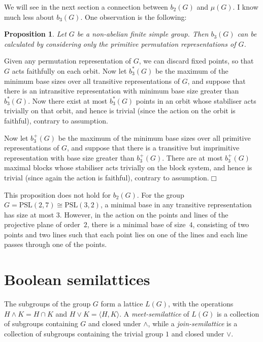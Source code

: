 \documentclass[12pt]{article}
\newtheorem{prop}{Proposition}[section]
\newenvironment{pf}{\prepf\rm}{\endprepf}
\newcommand{\qed}{\hfill$\Box$}
\begin{document}
We will see in the next section a connection between $b_2(G)$ and $\mu(G)$.
I know much less about $b_3(G)$. One observation is the following:

\begin{prop}
Let $G$ be a non-abelian finite simple group. Then $b_3(G)$ can be calculated
by considering only the primitive permutation representations of $G$.
\end{prop}

\begin{pf}
Given any permutation representation of $G$, we can discard fixed points, so
that $G$ acts faithfully on each orbit. Now let $b_3^*(G)$ be the maximum
of the minimum base sizes over all transitive representations of $G$, and
suppose that there is an intransitive representation with minimum base size
greater than $b_3^*(G)$. Now there exist at most $b_3^*(G)$ points in an orbit
whose stabiliser acts trivially on that orbit, and hence is trivial (since
the action on the orbit is faithful), contrary to assumption.

Now let $b_3^+(G)$ be the maximum of the minimum base sizes over all primitive
representations of $G$, and suppose that there is a transitive but
imprimitive representation with base size greater than $b_3^+(G)$. There are
at most $b_3^+(G)$ maximal blocks whose stabiliser acts trivially on the
block system, and hence is trivial (since again the action is faithful),
contrary to assumption.\qed
\end{pf}

This proposition does not hold for $b_2(G)$. For the group
$G=\mathrm{PSL}(2,7)\cong\mathrm{PSL}(3,2)$, a minimal base in any transitive
representation has size at most $3$. However, in the action on the points
and lines of the projective plane of order~$2$, there is a minimal base of
size~$4$, consisting of two points and two lines such that each point lies
on one of the lines and each line passes through one of the points.

\section{Boolean semilattices}

The subgroups of the group $G$ form a lattice $L(G)$, with the operations
$H\wedge K=H\cap K$ and $H\vee K=\langle H,K\rangle$. A 
\emph{meet-semilattice} of $L(G)$ is a collection of subgroups containing $G$
and closed under $\wedge$, while a \emph{join-semilattice} is a collection
of subgroups containing the trivial group $1$ and closed under $\vee$.
\end{document}
